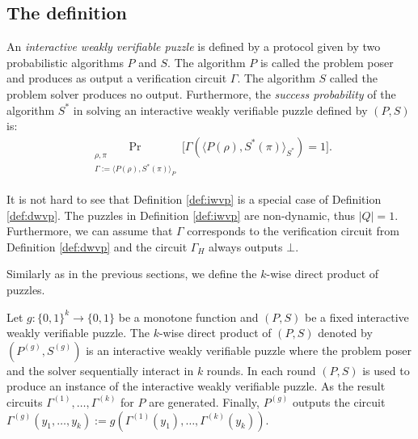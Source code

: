 \subsection{The definition}
\begin{definition}
  \label{def:iwvp}
An \textit{interactive weakly verifiable puzzle} is defined by a protocol given by two probabilistic algorithms $P$ and $S$.
The algorithm $P$ is called the problem poser and produces as output a verification circuit $\Gamma$.
The algorithm $S$ called the problem solver produces no output.
Furthermore, the \textit{success probability} of the algorithm $S^*$ in solving an interactive weakly verifiable puzzle defined by $(P,S)$ is:
\begin{align*}
  \underset{\substack{\rho, \pi \\ \Gamma := \langle P(\rho), S^*(\pi) \rangle_{P}}}{\Pr}\Big[\Gamma(\langle P(\rho),S^*(\pi) \rangle_{S^*}) = 1 \Big].
\end{align*}
\end{definition}
It is not hard to see that Definition \ref{def:iwvp} is a special case of Definition \ref{def:dwvp}.
The puzzles in Definition \ref{def:iwvp} are non-dynamic, thus $|Q| = 1$. Furthermore, we can assume that $\Gamma$
corresponds to the verification circuit from Definition \ref{def:dwvp} and the circuit $\Gamma_H$ always outputs $\bot$.

Similarly as in the previous sections, we define the $k$-wise direct product of puzzles.
\begin{definition}
Let $g: \{0,1\}^{k} \rightarrow \{0,1\}$ be a monotone function and $(P,S)$ be a fixed interactive weakly verifiable puzzle.
The $k$-wise direct product of $(P,S)$ denoted by $(P^{(g)}, S^{(g)})$ is an interactive weakly verifiable puzzle where the problem poser and the solver
sequentially interact in $k$ rounds. In each round $(P,S)$ is used to produce an instance of the interactive weakly verifiable puzzle.
As the result circuits $\Gamma^{(1)}, \dotsc, \Gamma^{(k)}$ for $P$ are generated.
Finally, $P^{(g)}$ outputs the circuit $\Gamma^{(g)}(y_1, \dotsc, y_k) := g(\Gamma^{(1)}(y_1), \dotsc, \Gamma^{(k)}(y_k))$.
\end{definition}

